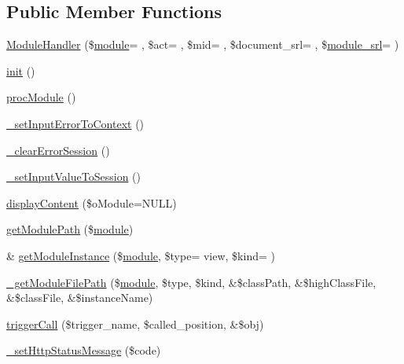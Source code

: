 \subsection*{Public Member Functions}
\begin{DoxyCompactItemize}
\item 
\hyperlink{classModuleHandler_abfb13533d16d60323823189ccca73237}{Module\+Handler} (\$\hyperlink{classmodule}{module}= \textquotesingle{}\textquotesingle{}, \$act= \textquotesingle{}\textquotesingle{}, \$mid= \textquotesingle{}\textquotesingle{}, \$document\+\_\+srl= \textquotesingle{}\textquotesingle{}, \$\hyperlink{ko_8install_8php_a370bb6450fab1da3e0ed9f484a38b761}{module\+\_\+srl}= \textquotesingle{}\textquotesingle{})
\item 
\hyperlink{classModuleHandler_a4a4671c196a893207c38af84c8ee7da8}{init} ()
\item 
\hyperlink{classModuleHandler_a74ad0ae3090eff1da5a6e0e68ce431d0}{proc\+Module} ()
\item 
\hyperlink{classModuleHandler_aa47d0ccb069d65698ade6f44bf6c705f}{\+\_\+set\+Input\+Error\+To\+Context} ()
\item 
\hyperlink{classModuleHandler_a45c91a72acccf3ee8139538ef5aa1c1d}{\+\_\+clear\+Error\+Session} ()
\item 
\hyperlink{classModuleHandler_ab3837506079a320e2726079777bb2b3e}{\+\_\+set\+Input\+Value\+To\+Session} ()
\item 
\hyperlink{classModuleHandler_a140c43faf30dedf139212294e3e9acf3}{display\+Content} (\$o\+Module=N\+U\+LL)
\item 
\hyperlink{classModuleHandler_a0a175bdc5034df0bf4ce66ea0e6e1bf2}{get\+Module\+Path} (\$\hyperlink{classmodule}{module})
\item 
\& \hyperlink{classModuleHandler_aea2e4d82f816ee25ec97ce2c830e6860}{get\+Module\+Instance} (\$\hyperlink{classmodule}{module}, \$type= \textquotesingle{}view\textquotesingle{}, \$kind= \textquotesingle{}\textquotesingle{})
\item 
\hyperlink{classModuleHandler_a75e1eb90149d7f6e38cfd5dc7a9521d4}{\+\_\+get\+Module\+File\+Path} (\$\hyperlink{classmodule}{module}, \$type, \$kind, \&\$class\+Path, \&\$high\+Class\+File, \&\$class\+File, \&\$instance\+Name)
\item 
\hyperlink{classModuleHandler_aa1b1f9eae91ccd76e6a81c9375c2e673}{trigger\+Call} (\$trigger\+\_\+name, \$called\+\_\+position, \&\$obj)
\item 
\hyperlink{classModuleHandler_a91c14051caea99153975f2335a2dc770}{\+\_\+set\+Http\+Status\+Message} (\$code)
\end{DoxyCompactItemize}
